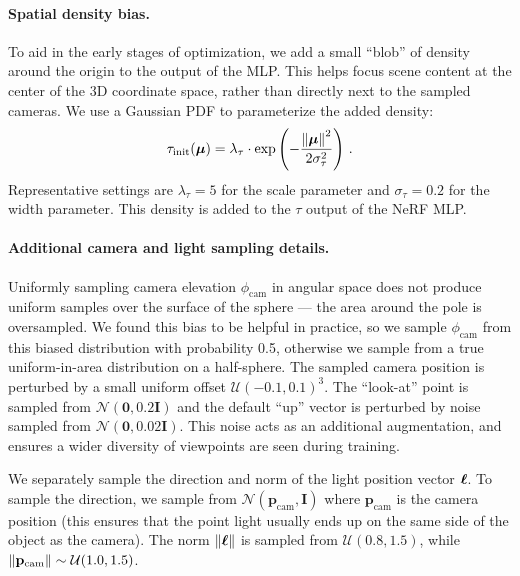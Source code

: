 \documentclass{article} %
\newcommand{\el}{\phi_{\textrm{cam}}}
\begin{document}
\paragraph{Spatial density bias.} To aid in the early stages of optimization, we add a small ``blob'' of density around the origin to the output of the MLP. This helps focus scene content at the center of the 3D coordinate space, rather than directly next to the sampled cameras. We use a Gaussian PDF to parameterize the added density:
\begin{equation}
    \tau_{\mathrm{init}}(\boldsymbol \mu) = \lambda_\tau \cdot \exp\left( -\frac{\left\lVert\boldsymbol\mu\right\rVert^2}{2 \sigma_\tau^2} \right)\, .
\end{equation}
Representative settings are $\lambda_\tau=5$ for the scale parameter and $\sigma_\tau=0.2$ for the width parameter. This density is added to the $\tau$ output of the NeRF MLP.



\paragraph{Additional camera and light sampling details.}
Uniformly sampling camera elevation $\el$ in angular space does not produce uniform samples over the surface of the sphere --- the area around the pole is oversampled. We  found this bias to be helpful in practice, so we sample $\el$ from this biased distribution with probability 0.5, otherwise we sample from a true uniform-in-area distribution on a half-sphere.
The sampled camera position is perturbed by a small uniform offset $\mathcal U(-0.1, 0.1)^3$. The ``look-at'' point is sampled from $\mathcal N(\mathbf{0}, 0.2 \mathbf{I})$ and the default ``up'' vector is perturbed by noise sampled from $\mathcal N(\mathbf{0}, 0.02 \mathbf{I})$. This noise acts as an additional augmentation, and ensures a wider diversity of viewpoints are seen during training.

We separately sample the direction and norm of the light position vector $\boldsymbol{\ell}$. To sample the direction, we sample from $\mathcal N(\mathbf{p}_\textrm{cam}, \mathbf{I})$ where $\mathbf{p}_\textrm{cam}$ is the camera position (this ensures that the point light usually ends up on the same side of the object as the camera). The norm $\left\lVert\boldsymbol{\ell}\right\rVert$ is sampled from $\mathcal U(0.8, 1.5)$, while  $\left\lVert\mathbf{p}_\textrm{cam}\right\rVert \sim \mathcal U(1.0, 1.5)$.
\end{document}
